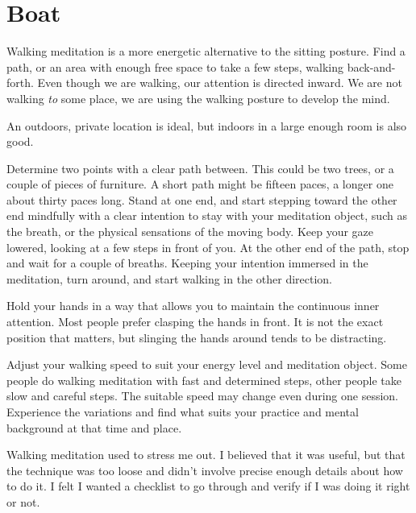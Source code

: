 \chapter{Boat}


\noindent Walking meditation is a more energetic alternative to the
sitting posture. Find a path, or an area with enough free space to take
a few steps, walking back-and-forth. Even though we are walking, our
attention is directed inward. We are not walking \emph{to} some place,
we are using the walking posture to develop the mind.

An outdoors, private location is ideal, but indoors in a large enough
room is also good.

Determine two points with a clear path between. This could be two trees,
or a couple of pieces of furniture. A short path might be fifteen paces,
a longer one about thirty paces long. Stand at one end, and start
stepping toward the other end mindfully with a clear intention to stay
with your meditation object, such as the breath, or the physical
sensations of the moving body. Keep your gaze lowered, looking at a few
steps in front of you. At the other end of the path, stop and wait for a
couple of breaths. Keeping your intention immersed in the meditation,
turn around, and start walking in the other direction.

Hold your hands in a way that allows you to maintain the continuous
inner attention. Most people prefer clasping the hands in front. It is
not the exact position that matters, but slinging the hands around tends
to be distracting.

\clearpage
{}%
%
\label{illus-walking-meditation}%
\clearpage

Adjust your walking speed to suit your energy level and meditation
object. Some people do walking meditation with fast and determined
steps, other people take slow and careful steps. The suitable speed may
change even during one session. Experience the variations and find what
suits your practice and mental background at that time and place.


Walking meditation used to stress me out. I believed that it was useful,
but that the technique was too loose and didn't involve precise enough
details about how to do it. I felt I wanted a checklist to go through
and verify if I was doing it right or not.


